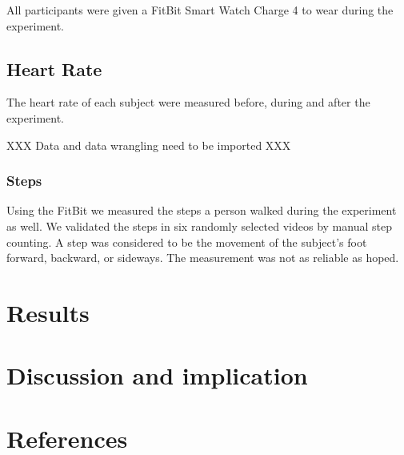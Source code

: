 \documentclass[
  man]{apa6}
\begin{document}
All participants were given a FitBit Smart Watch Charge 4 to wear during the experiment.

\hypertarget{heart-rate}{%
\subsection{Heart Rate}\label{heart-rate}}

The heart rate of each subject were measured before, during and after the experiment.

XXX Data and data wrangling need to be imported XXX

\hypertarget{steps}{%
\subsubsection{Steps}\label{steps}}

Using the FitBit we measured the steps a person walked during the experiment as well. We validated the steps in six randomly selected videos by manual step counting. A step was considered to be the movement of the subject's foot forward, backward, or sideways. The measurement was not as reliable as hoped.

\hypertarget{results}{%
\section{Results}\label{results}}

\hypertarget{discussion-and-implication}{%
\section{Discussion and implication}\label{discussion-and-implication}}

\newpage

\hypertarget{references}{%
\section{References}\label{references}}
\end{document}
